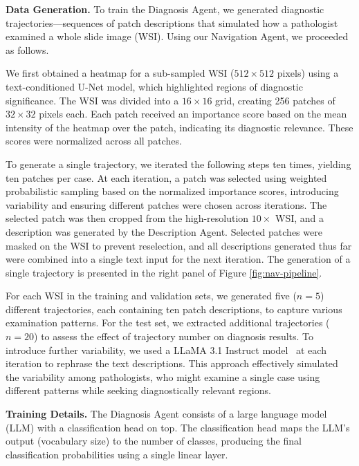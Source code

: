 \noindent
\textbf{Data Generation.} To train the Diagnosis Agent, we generated diagnostic trajectories—sequences of patch descriptions that simulated how a pathologist examined a whole slide image (WSI). Using our Navigation Agent, we proceeded as follows.

We first obtained a heatmap for a sub-sampled WSI ($512 \times 512$ pixels) using a text-conditioned U-Net model, which highlighted regions of diagnostic significance. The WSI was divided into a $16 \times 16$ grid, creating 256 patches of $32 \times 32$ pixels each. Each patch received an importance score based on the mean intensity of the heatmap over the patch, indicating its diagnostic relevance. These scores were normalized across all patches.

To generate a single trajectory, we iterated the following steps ten times, yielding ten patches per case. At each iteration, a patch was selected using weighted probabilistic sampling based on the normalized importance scores, introducing variability and ensuring different patches were chosen across iterations. The selected patch was then cropped from the high-resolution $10\times$ WSI, and a description was generated by the Description Agent. Selected patches were masked on the WSI to prevent reselection, and all descriptions generated thus far were combined into a single text input for the next iteration. The generation of a single trajectory is presented in the right panel of Figure \ref{fig:nav-pipeline}.

For each WSI in the training and validation sets, we generated five ($n=5$) different trajectories, each containing ten patch descriptions, to capture various examination patterns. For the test set, we extracted additional trajectories ($n=20$) to assess the effect of trajectory number on diagnosis results. To introduce further variability, we used a LLaMA 3.1 Instruct model~\cite{dubey2024llama} at each iteration to rephrase the text descriptions. This approach effectively simulated the variability among pathologists, who might examine a single case using different patterns while seeking diagnostically relevant regions.





\noindent
\textbf{Training Details.} The Diagnosis Agent consists of a large language model (LLM) with a classification head on top. The classification head maps the LLM’s output (vocabulary size) to the number of classes, producing the final classification probabilities using a single linear layer.

